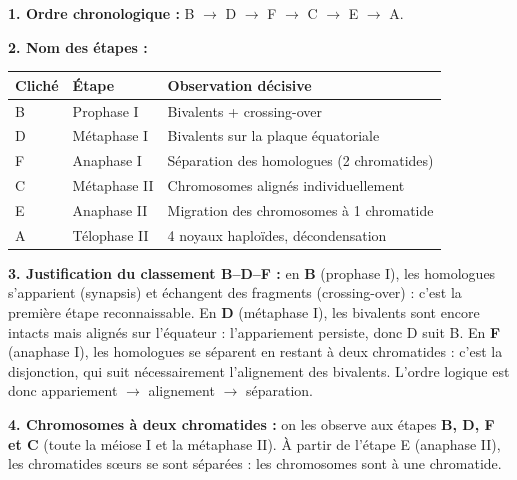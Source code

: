 \documentclass[11pt]{article}
\begin{document}
\begin{corrige}
\textbf{1. Ordre chronologique :} B $\rightarrow$ D $\rightarrow$ F $\rightarrow$ C $\rightarrow$ E $\rightarrow$ A.

\textbf{2. Nom des étapes :}
\begin{center}
\begin{tabularx}{\linewidth}{|l|X|X|}\hline
\rowcolor{popblueL} Cliché & Étape & Observation décisive \\ \hline
B & Prophase I & Bivalents + crossing-over \\ \hline
D & Métaphase I & Bivalents sur la plaque équatoriale \\ \hline
F & Anaphase I & Séparation des homologues (2 chromatides) \\ \hline
C & Métaphase II & Chromosomes alignés individuellement \\ \hline
E & Anaphase II & Migration des chromosomes à 1 chromatide \\ \hline
A & Télophase II & 4 noyaux haploïdes, décondensation \\ \hline
\end{tabularx}
\end{center}

\textbf{3. Justification du classement B--D--F :} en \textbf{B} (prophase I), les homologues s'apparient (synapsis) et échangent des fragments (crossing-over) : c'est la première étape reconnaissable. En \textbf{D} (métaphase I), les bivalents sont encore intacts mais alignés sur l'équateur : l'appariement persiste, donc D suit B. En \textbf{F} (anaphase I), les homologues se séparent en restant à deux chromatides : c'est la disjonction, qui suit nécessairement l'alignement des bivalents. L'ordre logique est donc appariement $\rightarrow$ alignement $\rightarrow$ séparation.

\textbf{4. Chromosomes à deux chromatides :} on les observe aux étapes \textbf{B, D, F et C} (toute la méiose I et la métaphase II). À partir de l'étape E (anaphase II), les chromatides s\oe urs se sont séparées : les chromosomes sont à une chromatide.
\end{corrige}
\end{document}
